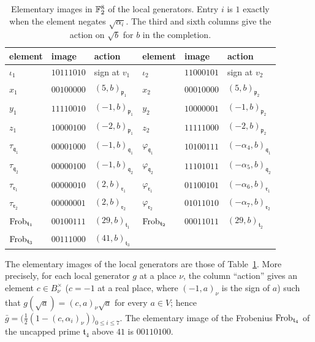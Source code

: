 \begin{table}[htbp]
\centering
\caption{Elementary images in $\mathbb F_2^8$ of the local generators. Entry $i$
is $1$ exactly when the element negates $\sqrt{\alpha_i}$. The third and
sixth columns give the action on $\sqrt b$ for $b$ in the completion.}
\label{tw:vector-table}
\begin{tabular}{lll@{\qquad}lll}
\toprule
element & image & action & element & image & action\\
\midrule
$\iota_1$ & $10111010$ & sign at $v_1$ & $\iota_2$ & $11000101$ & sign at $v_2$\\
$x_1$ & $00100000$ & $(5,b)_{\mathfrak p_1}$ & $x_2$ & $00010000$ & $(5,b)_{\mathfrak p_2}$\\
$y_1$ & $11110010$ & $(-1,b)_{\mathfrak p_1}$ & $y_2$ & $10000001$ & $(-1,b)_{\mathfrak p_2}$\\
$z_1$ & $10000100$ & $(-2,b)_{\mathfrak p_1}$ & $z_2$ & $11111000$ & $(-2,b)_{\mathfrak p_2}$\\
$\tau_{\mathfrak q_1}$ & $00001000$ & $(-1,b)_{\mathfrak q_1}$ & $\varphi_{\mathfrak q_1}$ & $10100111$ & $(-\alpha_4,b)_{\mathfrak q_1}$\\
$\tau_{\mathfrak q_2}$ & $00000100$ & $(-1,b)_{\mathfrak q_2}$ & $\varphi_{\mathfrak q_2}$ & $11101011$ & $(-\alpha_5,b)_{\mathfrak q_2}$\\
$\tau_{\mathfrak r_1}$ & $00000010$ & $(2,b)_{\mathfrak r_1}$ & $\varphi_{\mathfrak r_1}$ & $01100101$ & $(-\alpha_6,b)_{\mathfrak r_1}$\\
$\tau_{\mathfrak r_2}$ & $00000001$ & $(2,b)_{\mathfrak r_2}$ & $\varphi_{\mathfrak r_2}$ & $01011010$ & $(-\alpha_7,b)_{\mathfrak r_2}$\\
$\operatorname{Frob}_{\mathfrak t_1}$ & $00100111$ & $(29,b)_{\mathfrak t_1}$ & $\operatorname{Frob}_{\mathfrak t_2}$ & $00011011$ & $(29,b)_{\mathfrak t_2}$\\
$\operatorname{Frob}_{\mathfrak t_3}$ & $00111000$ & $(41,b)_{\mathfrak t_3}$ & & &\\
\bottomrule
\end{tabular}
\end{table}

\begin{lemma}\label{tw:vectors}
The elementary images of the local generators are those of
Table~\ref{tw:vector-table}. More precisely, for each local generator $g$ at
a place $\nu$, the column ``action'' gives an element $c\in B_\nu^\times$
($c=-1$ at a real place, where $(-1,a)_\nu$ is the sign of $a$) such that
$g(\sqrt a)=(c,a)_\nu\sqrt a$ for every $a\in V$; hence
$\bar g=\bigl(\tfrac12(1-(c,\alpha_i)_\nu)\bigr)_{0\le i\le7}$. The
elementary image of the Frobenius $\operatorname{Frob}_{\mathfrak t_4}$ of the uncapped
prime $\mathfrak t_4$ above $41$ is $00110100$.
\end{lemma}


